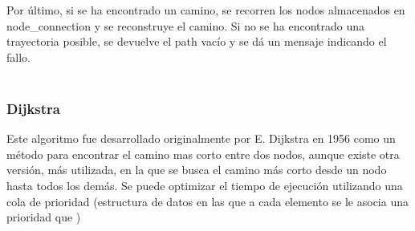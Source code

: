Por último, si se ha encontrado un camino, se recorren los nodos almacenados en node_connection y se reconstruye el camino. Si no se ha encontrado una trayectoria posible, se devuelve el path vacío y se dá un mensaje indicando el fallo.\\
\\

\subsubsection{Dijkstra}

Este algoritmo fue desarrollado originalmente por E. Dijkstra en 1956 como un método para encontrar el camino mas corto entre dos nodos, aunque existe otra versión, más utilizada, en la que se busca el camino más corto desde un nodo hasta todos los demás. Se puede optimizar el tiempo de ejecución utilizando una cola de prioridad (estructura de datos en las que a cada elemento se le asocia una prioridad que )